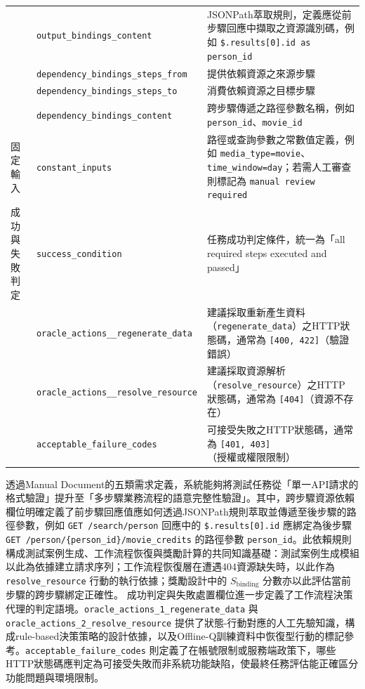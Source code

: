 \begin{ZhChapter}
\begin{table}[H]
\begin{tabularx}{\textwidth}{>{\raggedright\arraybackslash}p{2.2cm} >{\raggedright\arraybackslash}p{4.4cm} >{\raggedright\arraybackslash}X}
& \texttt{output\_bindings\_content} & JSONPath萃取規則，定義應從前步驟回應中擷取之資源識別碼，例如 \texttt{\$.results[0].id as person\_id} \\
& \texttt{dependency\_bindings\_\allowbreak steps\_from} & 提供依賴資源之來源步驟 \\
& \texttt{dependency\_bindings\_\allowbreak steps\_to} & 消費依賴資源之目標步驟 \\
& \texttt{dependency\_bindings\_content} & 跨步驟傳遞之路徑參數名稱，例如 \texttt{person\_id}、\texttt{movie\_id} \\
\midrule
固定輸入 & \texttt{constant\_inputs} & 路徑或查詢參數之常數值定義，例如 \texttt{media\_type=movie}、\texttt{time\_window=day}；若需人工審查則標記為 \texttt{manual review required} \\
\midrule
成功與失敗判定 & \texttt{success\_condition} & 任務成功判定條件，統一為「all required steps executed and passed」 \\
& \texttt{oracle\_actions\_\allowbreak 1\_\allowbreak regenerate\_data} & 建議採取重新產生資料（\texttt{regenerate\_data}）之HTTP狀態碼，通常為 \texttt{[400, 422]}（驗證錯誤） \\
& \texttt{oracle\_actions\_\allowbreak 2\_\allowbreak resolve\_resource} & 建議採取資源解析（\texttt{resolve\_resource}）之HTTP狀態碼，通常為 \texttt{[404]}（資源不存在） \\
& \texttt{acceptable\_failure\_codes} & 可接受失敗之HTTP狀態碼，通常為 \texttt{[401, 403]}（授權或權限限制） \\
\bottomrule
\end{tabularx}
\end{table}

\text 透過Manual Document的五類需求定義，系統能夠將測試任務從「單一API請求的格式驗證」提升至「多步驟業務流程的語意完整性驗證」。其中，跨步驟資源依賴欄位明確定義了前步驟回應值應如何透過JSONPath規則萃取並傳遞至後步驟的路徑參數，例如 \texttt{GET /search/person} 回應中的 \texttt{\$.results[0].id} 應綁定為後步驟 \texttt{GET /person/\{person\_id\}/movie\_credits} 的路徑參數 \texttt{person\_id}。此依賴規則構成測試案例生成、工作流程恢復與獎勵計算的共同知識基礎：測試案例生成模組以此為依據建立請求序列；工作流程恢復層在遭遇404資源缺失時，以此作為 \texttt{resolve\_resource} 行動的執行依據；獎勵設計中的 $S_{\text{binding}}$ 分數亦以此評估當前步驟的跨步驟綁定正確性。
\text 成功判定與失敗處置欄位進一步定義了工作流程決策代理的判定語境。\texttt{oracle\_actions\_1\_regenerate\_data} 與 \texttt{oracle\_actions\_2\_resolve\_resource} 提供了狀態-行動對應的人工先驗知識，構成rule-based決策策略的設計依據，以及Offline-Q訓練資料中恢復型行動的標記參考。\texttt{acceptable\_failure\_codes} 則定義了在帳號限制或服務端政策下，哪些HTTP狀態碼應判定為可接受失敗而非系統功能缺陷，使最終任務評估能正確區分功能問題與環境限制。


\end{ZhChapter}

